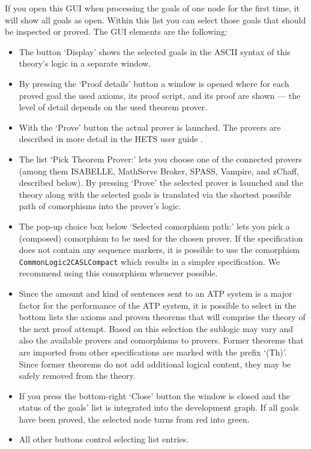 \documentclass{article}
\newcommand{\normalTEXTSC}[2]{{#1\scriptsize#2}}
\newcommand     {\Hets}{\normalTEXTSC{H}{ETS}\xspace}
\newcommand     {\Isabelle}{\normalTEXTSC{I}{SABELLE}\xspace}
\newcommand     {\SPASS}{\normalTEXTSC{S}{PASS}\xspace}
\begin{document}
If you open this GUI when processing the goals of one node for the
first time, it will show all goals as open. Within this list you can
select those goals that should be inspected or proved. The GUI elements are the following:

\begin{itemize}
\item The button `Display' shows the selected goals in the ASCII syntax of
  this theory's logic in a separate window.
\item By pressing the `Proof details' button a window is opened where for each
  proved goal the used axioms, its proof script, and its proof are shown ---
  the level of detail depends on the used theorem prover.
\item With the `Prove' button the actual prover is launched. The provers are described
  in more detail in the \Hets user guide \cite{HetsUserGuide}.
\item The list `Pick Theorem Prover:' lets you choose one of the connected
  provers (among them \Isabelle, MathServe Broker, \SPASS, Vampire, and
  zChaff, described below). By pressing `Prove' the selected prover is
  launched and the theory along with the selected goals is translated via the
  shortest possible path of comorphisms into the prover's logic.
\item The pop-up choice box below `Selected comorphism path:' lets you pick a
  (composed) comorphism to be used for the chosen prover. If the specification
  does not contain any sequence markers, it is possible to use the comorphism
  \texttt{CommonLogic2CASLCompact} which results in a simpler 
  \CASL specification. We recommend using this comorphism whenever possible.
\item Since the amount and kind of sentences sent to an ATP system is a major
  factor for the performance of the ATP system, it is possible to select in
  the bottom lists the axioms and proven theorems that will comprise the
  theory of the next proof attempt. Based on this selection the sublogic may
  vary and also the available provers and comorphisms to provers. Former
  theorems that are imported from other specifications are marked with the
  prefix `(Th)'. Since former theorems do not add additional logical content,
  they may be safely removed from the theory.
\item If you press the bottom-right `Close' button the window is closed and
  the status of the goals' list is integrated into the development graph. If
  all goals have been proved, the selected node turns from red into green.
\item All other buttons control selecting list entries.
\end{itemize}
\end{document}
